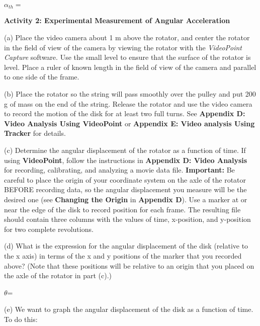 \( \alpha _{th}= \)
\vspace{5mm}

\textbf{Activity 2: Experimental Measurement of Angular Acceleration} 

(a) Place the video camera about 1 m above the rotator, and center the rotator in the field of view of the camera by viewing the rotator with the \textit{VideoPoint Capture} software. Use the small level to ensure that the surface of the rotator is level. Place a ruler of known length in the field of view of the camera and parallel to one side of the frame.

(b) Place the rotator so the string will pass smoothly over the pulley and put
200 g of mass on the end of the string. Release the rotator and use the
video camera to record the motion of the disk for at least two full turns. See
\textbf{Appendix D: Video Analysis Using VideoPoint} or 
\textbf{Appendix E: Video analysis Using Tracker} for details.

(c) Determine the angular displacement of the rotator as a function of time. If using \textbf{VideoPoint}, follow the instructions in \textbf{Appendix D: Video Analysis} for recording, calibrating, and analyzing a movie data file. \textbf{Important:} Be careful to place the origin of your coordinate system on the axle of the rotator BEFORE recording data, so the angular displacement you measure will be the desired one (see \textbf{Changing the Origin} in \textbf{Appendix D}). Use a marker at or near the edge of the disk to record position for each frame. The resulting file should contain three columns with the values of time, x-position, and y-position for two complete revolutions.

(d) What is the expression for the angular displacement of the disk (relative to the x axis) in terms of the x and y positions of the marker that you recorded above? (Note that these positions will be relative to an origin that you placed on the axle of the rotator in part (c).)
\vspace{5mm}

\( \theta  \)= 
\vspace{5mm}

(e) We want to graph the angular displacement of the disk as a function of time.
To do this:

